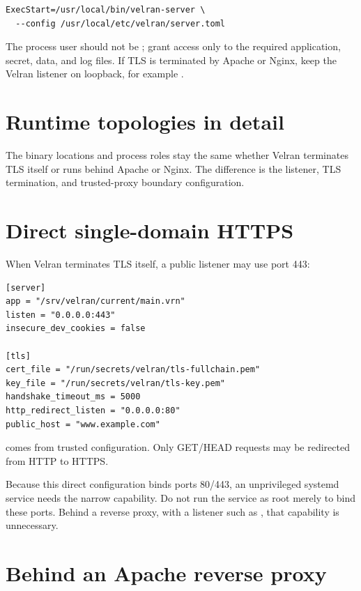 \begin{lstlisting}
ExecStart=/usr/local/bin/velran-server \
  --config /usr/local/etc/velran/server.toml
\end{lstlisting}

The process user should not be ; grant access only to the required application, secret, data, and log files. If TLS is terminated by Apache or Nginx, keep the Velran listener on loopback, for example .

\section{Runtime topologies in detail}

The binary locations and process roles stay the same whether Velran terminates TLS itself or runs behind Apache or Nginx. The difference is the listener, TLS termination, and trusted-proxy boundary configuration.

\section{Direct single-domain HTTPS}

When Velran terminates TLS itself, a public listener may use port 443:

\begin{lstlisting}
[server]
app = "/srv/velran/current/main.vrn"
listen = "0.0.0.0:443"
insecure_dev_cookies = false

[tls]
cert_file = "/run/secrets/velran/tls-fullchain.pem"
key_file = "/run/secrets/velran/tls-key.pem"
handshake_timeout_ms = 5000
http_redirect_listen = "0.0.0.0:80"
public_host = "www.example.com"
\end{lstlisting}

 comes from trusted configuration. Only GET/HEAD requests may be redirected from HTTP to HTTPS.

Because this direct configuration binds ports 80/443, an unprivileged systemd service needs the narrow  capability. Do not run the service as root merely to bind these ports. Behind a reverse proxy, with a listener such as , that capability is unnecessary.

\section{Behind an Apache reverse proxy}

